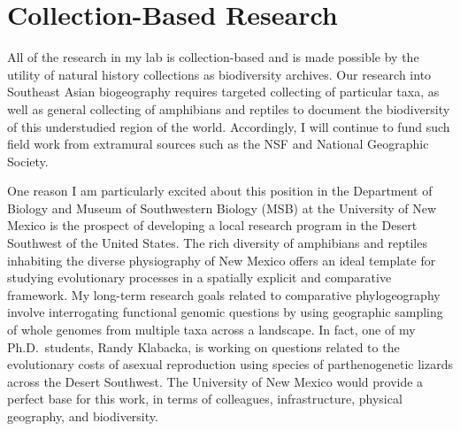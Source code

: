 \documentclass[10pt]{article}
\begin{document}
\section*{Collection-Based Research}
All of the research in my lab is collection-based and is made possible by the
utility of natural history collections as biodiversity archives.
Our research into Southeast Asian biogeography requires targeted collecting of
particular taxa, as well as general collecting of amphibians and reptiles to
document the biodiversity of this understudied region of the world.
Accordingly, I will continue to fund such field work from extramural sources
such as the NSF and National Geographic Society.

One reason I am particularly excited about this position in the
Department of Biology
and Museum of Southwestern Biology (MSB)
at the University of New Mexico
is the prospect of developing
a local research program in the
Desert Southwest of the United States.
The rich diversity of amphibians and reptiles inhabiting the diverse
physiography of New Mexico offers an ideal template for studying evolutionary
processes in a spatially explicit and comparative framework.
My long-term research goals related to comparative phylogeography involve
interrogating functional genomic questions by using geographic sampling of
whole genomes from multiple taxa across a landscape.
In fact, one of my Ph.D.\ students, Randy Klabacka, is working on questions
related to the evolutionary costs of asexual reproduction using species of
parthenogenetic lizards across the Desert Southwest.
The University of New Mexico would provide a perfect base for this work, in
terms of colleagues, infrastructure, physical geography, and biodiversity.
\end{document}
